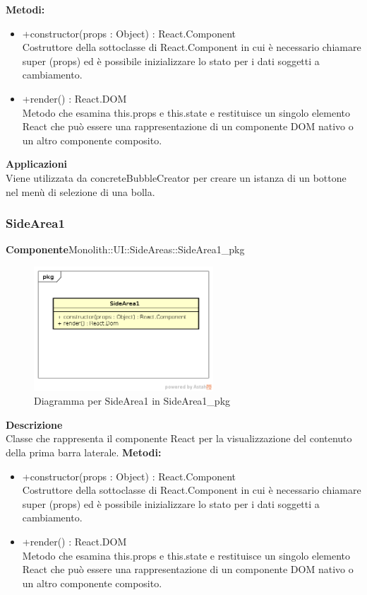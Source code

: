 \textbf{Metodi:} \begin{itemize}\item +constructor(props : Object) : React.Component \\Costruttore della sottoclasse di React.Component in cui è necessario chiamare super (props) ed è possibile inizializzare lo stato per i dati soggetti a cambiamento. 

\item +render() : React.DOM \\Metodo che esamina this.props e this.state e restituisce un singolo elemento React che può essere una rappresentazione di un componente DOM nativo o un altro componente composito.\end{itemize} 


\textbf{Applicazioni}\\
Viene utilizzata da concreteBubbleCreator per creare un istanza di un bottone nel menù di selezione di una bolla. 


\clearpage

\subsubsection{SideArea1}
\textbf{Componente}Monolith::UI::SideAreas::SideArea1\_pkg\\
   \FloatBarrier
   \begin{figure}[ht]
   \centering
   \includegraphics[width=0.6\textwidth]{img/single-SideArea1}
   \caption{{Diagramma per SideArea1 in SideArea1\_pkg}}
\end{figure}
\FloatBarrier
\textbf{Descrizione}\\
Classe che rappresenta il componente React per la visualizzazione del contenuto della prima barra laterale.
\textbf{Metodi:} \begin{itemize}\item +constructor(props : Object) : React.Component \\Costruttore della sottoclasse di React.Component in cui è necessario chiamare super (props) ed è possibile inizializzare lo stato per i dati soggetti a cambiamento.\item +render() : React.DOM \\Metodo che esamina this.props e this.state e restituisce un singolo elemento React che può essere una rappresentazione di un componente DOM nativo o un altro componente composito.\end{itemize} 


